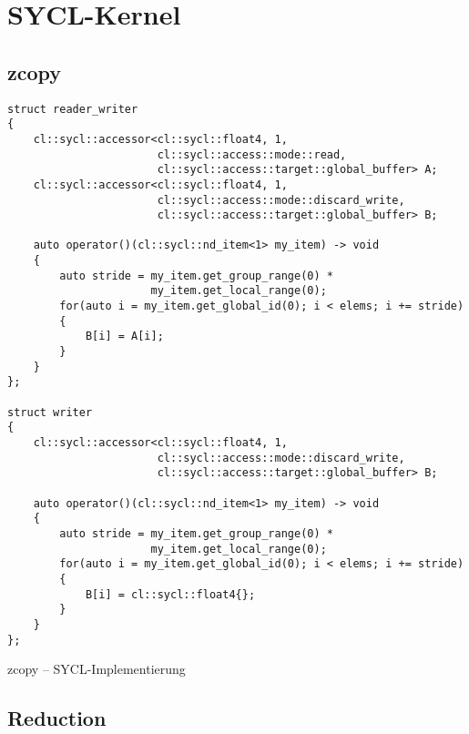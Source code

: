 \section{SYCL-Kernel}

\subsection{zcopy}

\begin{code}
    \begin{verbatim}
struct reader_writer
{
    cl::sycl::accessor<cl::sycl::float4, 1,
                       cl::sycl::access::mode::read,
                       cl::sycl::access::target::global_buffer> A;
    cl::sycl::accessor<cl::sycl::float4, 1,
                       cl::sycl::access::mode::discard_write,
                       cl::sycl::access::target::global_buffer> B;

    auto operator()(cl::sycl::nd_item<1> my_item) -> void
    {
        auto stride = my_item.get_group_range(0) *
                      my_item.get_local_range(0);
        for(auto i = my_item.get_global_id(0); i < elems; i += stride)
        {
            B[i] = A[i];
        }
    }
};

struct writer
{
    cl::sycl::accessor<cl::sycl::float4, 1,
                       cl::sycl::access::mode::discard_write,
                       cl::sycl::access::target::global_buffer> B;

    auto operator()(cl::sycl::nd_item<1> my_item) -> void
    {
        auto stride = my_item.get_group_range(0) *
                      my_item.get_local_range(0);
        for(auto i = my_item.get_global_id(0); i < elems; i += stride)
        {
            B[i] = cl::sycl::float4{};
        }
    }
};
    \end{verbatim}
    \caption{zcopy -- SYCL-Implementierung}
    \label{anhang:sycl:zcopy}
\end{code}

\subsection{Reduction}

